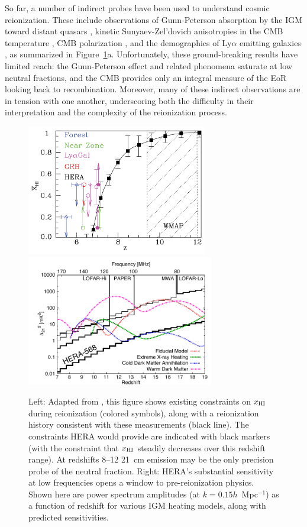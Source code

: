 \documentclass[preprint]{aastex}
\def\HI{{H{\small I }}}
\def\xHI{{x_{\rm\HI}}}
\begin{document}
So far, a number of indirect probes have been used to understand cosmic
reionization.  These include observations of Gunn-Peterson absorption by the
IGM toward distant quasars \citep{fan_et_al2006},
kinetic Sunyaev-Zel'dovich anisotropies in the CMB temperature \citep{zahn_et_al2012_trunc}, CMB
polarization \citep{page_et_al2007,planck_et_al2013}, and the
demographics of Ly$\alpha$ emitting galaxies
\citep{treu_et_al2013}, as summarized in Figure~\ref{fig:x_i_Xray}a.  Unfortunately,
these ground-breaking results have limited reach: the
Gunn-Peterson effect and related phenomena saturate at low neutral fractions,
and the CMB provides only an integral measure of %
the EoR looking %
back to recombination.  Moreover, many of these indirect observations are in
tension with one another, underscoring both the difficulty in their interpretation
and the complexity of the reionization process.


\begin{figure}[t]\centering
\includegraphics[height=2.25in]{plots/constraints_crop.pdf}  %
\includegraphics[height=2.25in]{plots/Xray.pdf} 
\caption{\small 
Left: Adapted from \citet{robertson_2013}, this figure shows existing
constraints on $\xHI$ during reionization (colored symbols), along with a
reionization history consistent with these measurements (black line). The
constraints HERA would provide are indicated with black markers (with the constraint
that $\xHI$ steadily decreases over this redshift range). At redshifts 8--12
21~cm emission may be the only precision probe of the neutral fraction.  
Right: HERA’s substantial sensitivity at low frequencies opens a window to
pre-reionization physics. Shown here are power spectrum amplitudes (at $k =
0.15h$~Mpc$^{-1}$) as a function of redshift for various IGM heating models,
along with predicted sensitivities.
}\label{fig:x_i_Xray} \end{figure}
\end{document}
